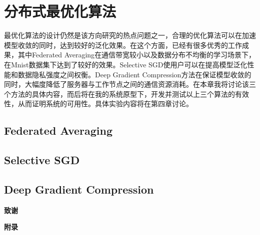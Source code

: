 \documentclass[zihao = -4,cn]{oucart}
\begin{document}
\section{分布式最优化算法}
最优化算法的设计仍然是该方向研究的热点问题之一，合理的优化算法可以在加速模型收敛的同时，达到较好的泛化效果。在这个方面，已经有很多优秀的工作成果，其中Federated Averaging\cite{mcmahan2016communication}在通信带宽较小以及数据分布不均衡的学习场景下，在Mnist数据集下达到了较好的效果。Selective SGD\cite{shokri2015privacy}使用户可以在提高模型泛化性能和数据隐私强度之间权衡。Deep Gradient Compression\cite{lin2017deep}方法在保证模型收敛的同时，大幅度降低了服务器与工作节点之间的通信资源消耗。在本章我将讨论该三个方法的具体内容，而后将在我的系统原型下，开发并测试以上三个算法的有效性，从而证明系统的可用性。具体实验内容将在第四章讨论。
\subsection{Federated Averaging}
\subsection{Selective SGD}
\subsection{Deep Gradient Compression}
\newpage
%


\newpage
\begin{center}
 \textbf{致谢} \\
\end{center}

\newpage
\begin{center}
 \textbf{附录} \\
\end{center}
\end{document}
